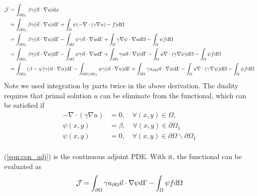\documentclass[a4paper]{article}
\begin{document}
\begin{equation}
\begin{aligned}
	\mathcal{J} &= \int_{\partial\Omega_{1}}\beta\gamma(\vec{n}\cdot\nabla u) \mathrm{d} x \\
	&=\int_{\partial\Omega_{1}}\beta\gamma(\vec{n}\cdot\nabla u) \mathrm{d}\Gamma + \int_{\Omega} \psi(-\nabla\cdot (\gamma\nabla u) - f)\mathrm{d}\Omega \\
	&=\int_{\partial\Omega_{1}}\beta\gamma(\vec{n}\cdot\nabla u) \mathrm{d}\Gamma - \int_{\partial\Omega} \psi\gamma\vec{n}\cdot\nabla u\mathrm{d}\Gamma + \int_{\Omega} \gamma\nabla\psi\cdot \nabla u\mathrm{d}\Omega - \int_{\Omega}\psi f\mathrm{d}\Omega \\
	&=\int_{\partial\Omega_{1}}\beta\gamma(\vec{n}\cdot\nabla u) \mathrm{d}\Gamma - \int_{\partial\Omega} \psi\gamma\vec{n}\cdot\nabla u\mathrm{d}\Gamma + \int_{\partial\Omega}\gamma u\vec{n}\cdot\nabla\psi\mathrm{d}\Gamma  - \int_{\Omega} u\nabla\cdot(\gamma  \nabla \psi)\mathrm{d}\Omega - \int_{\Omega}\psi f\mathrm{d}\Omega \\
	&= \int_{\partial\Omega_{1}}(\beta - \psi)\gamma(\vec{n}\cdot\nabla u) \mathrm{d}\Gamma - \int_{\partial\Omega\backslash\partial\Omega_{1}}\psi\gamma(\vec{n}\cdot\nabla u) \mathrm{d}\Gamma + \int_{\partial\Omega}\gamma u_{\partial\Omega}\vec{n}\cdot\nabla\psi\mathrm{d}\Gamma - \int_{\Omega} u\nabla\cdot (\gamma \nabla \psi)\mathrm{d}\Omega - \int_{\Omega}\psi f\mathrm{d}\Omega \\
\end{aligned}
\end{equation}
Note we used integration by parts twice in the above derivation. The duality requires that primal solution $u$ can be eliminate from the functional, which can be satisfied if
\begin{equation} \label{eqn:con_adj}
\begin{aligned}
	-\nabla\cdot(\gamma\nabla u) &= 0, \quad \forall (x,y) \in\Omega, \\
	\psi(x,y)  &= \beta, \quad\forall(x,y) \in\partial\Omega_1 \\
	\psi(x,y)  &= 0, \quad\forall(x,y) \in\partial\Omega\backslash\partial\Omega_1 \\
\end{aligned}
\end{equation}

(\ref{eqn:con_adj}) is the continuous adjoint PDE. With it, the functional can be evaluated as
\begin{equation}
	\mathcal{J} = \int_{\partial\Omega}\gamma u_{\partial\Omega}\vec{n}\cdot\nabla\psi\mathrm{d}\Gamma - \int_{\Omega}\psi f\mathrm{d}\Omega \\
\end{equation}
\end{document}
